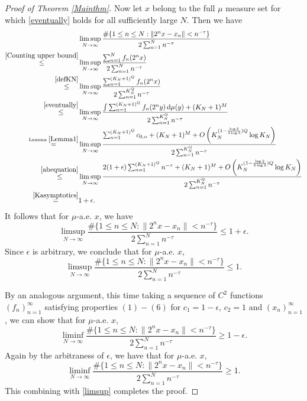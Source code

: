 \documentclass[amssymb,amsfonts,refcheck,12pt,verbatim,righttag]{amsart}
\numberwithin{equation}{section} %
\theoremstyle{plain}
\begin{document}
\begin{proof}[Proof of Theorem \ref{Mainthm}]
	
	
	Now let $x$ belong to the full $\mu$ measure set for which \eqref{eventually} holds for all sufficiently large $N$. Then we have
	\begin{align*}
		&\limsup_{N\to\infty}\frac{\#\{1\leq n\leq N:\|2^{n}x-x_n\|< n^{-\tau}\}}{2\sum_{n=1}^{N}n^{-\tau}}\\
		\stackrel{\eqref{Counting upper bound}}{\leq} & \limsup_{N\to\infty}\frac{\sum_{n=1}^{N}f_{n}(2^nx)}{2\sum_{n=1}^{N}n^{-\tau}}\\
		\stackrel{\eqref{defKN}}\leq &  \limsup_{N\to\infty}\frac{\sum_{n=1}^{(K_{N}+1)^{Q}}f_{n}(2^nx)}{2\sum_{n=1}^{K_{N}^{Q}}n^{-\tau}}\\
		\stackrel{\eqref{eventually}}{\leq}& \limsup_{N\to\infty}\frac{\int \sum_{n=1}^{(K_{N}+1)^{Q}}f_{n}(2^ny)\, \mathrm{d}\mu(y)+(K_{N}+1)^{M}}{2\sum_{n=1}^{K_{N}^{Q}}n^{-\tau}}\\
		\stackrel{\text{Lemma }\ref{Lemma1}}{=}&\limsup_{N\to\infty}\frac{\sum_{n=1}^{(K_{N}+1)^{Q}}c_{0,n}+(K_{N}+1)^{M}+O\left(K_{N}^{(1-\frac{\log2}{3\log3})Q}\log K_{N}\right)}{2\sum_{n=1}^{K_{N}^{Q}}n^{-\tau}}\\
		\stackrel{\eqref{abequation}}{\leq}& \limsup_{N\to\infty}\frac{2(1+\epsilon)\sum_{n=1}^{(K_N+1)^{Q}}n^{-\tau}+(K_{N}+1)^{M}+O\left(K_{N}^{(1-\frac{\log2}{3\log3})Q}\log K_{N}\right)}{2\sum_{n=1}^{K_{N}^{Q}}n^{-\tau}}\\
		\stackrel{\eqref{Kasymptotics}}{=}&1+\epsilon.
	\end{align*}
	 It follows that for $\mu$-a.e. $x$, we have  
	$$\limsup_{N\to\infty}\frac{\#\{1\leq n\leq N:\|2^{n}x-x_n\|<n^{-\tau}\}}{2\sum_{n=1}^{N}n^{-\tau}}\leq 1+\epsilon.$$ Since $\epsilon$ is arbitrary, we conclude that for $\mu$-a.e. $x$,
	\begin{equation}
		\label{limsup}
		\limsup_{N\to\infty}\frac{\#\{1\leq n\leq N:\|2^{n}x-x_n\|<n^{-\tau}\}}{2\sum_{n=1}^{N}n^{-\tau}}\leq 1.
	\end{equation}
	 
	
	By an analogous argument, this time taking a sequence of $C^{2}$ functions $(f_n)_{n=1}^{\infty}$ satisfying properties $(1)-(6)$ for $c_{1}=1-\epsilon$, $c_{2}=1$ and $(x_{n})_{n=1}^{\infty}$, we can show that for $\mu$-a.e. $x$, 
$$\liminf_{N\to\infty}\frac{\#\{1\leq n\leq N:\| 2^{n}x-x_n\|<n^{-\tau}\}}{2\sum_{n=1}^{N}n^{-\tau}}\geq 1-\epsilon.$$ 
Again by the arbitraness of  $\epsilon$, we have that for $\mu$-a.e. $x$,
\begin{equation*}
\liminf_{N\to\infty}\frac{\#\{1\leq n\leq N:\|2^{n}x-x_n\|< n^{-\tau}\}}{2\sum_{n=1}^{N}n^{-\tau}}\geq 1.
\end{equation*}
This combining with \eqref{limsup} completes the proof. 
\end{proof}
\end{document}
